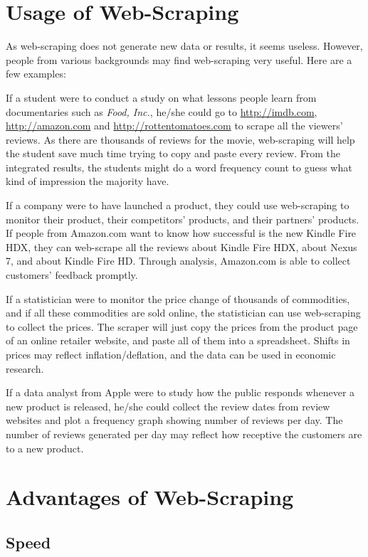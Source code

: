 \documentclass[12pt]{report}
\begin{document}
\section{Usage of Web-Scraping}
As web-scraping does not generate new data or results, it seems useless. However, people from various backgrounds may find web-scraping very useful. Here are a few examples:

If a student were to conduct a study on what lessons people learn from documentaries such as \textit{Food, Inc.}, he/she could go to \url{http://imdb.com}, \url{http://amazon.com} and \url{http://rottentomatoes.com} to scrape all the viewers' reviews. As there are thousands of reviews for the movie, web-scraping will help the student save much time trying to copy and paste every review. From the integrated results, the students might do a word frequency count to guess what kind of impression the majority have.

If a company were to have launched a product, they could use web-scraping to monitor their product, their competitors' products, and their partners' products. If people from Amazon.com  want to know how successful is the new Kindle Fire HDX, they can web-scrape all the reviews about Kindle Fire HDX, about Nexus 7, and about Kindle Fire HD. Through analysis, Amazon.com is able to collect customers' feedback promptly.

If a statistician were to monitor the price change of thousands of commodities, and if all these commodities are sold online, the statistician can use web-scraping to collect the prices. The scraper will just copy the prices from the product page of an online retailer website, and paste all of them into a spreadsheet. Shifts  in prices may reflect inflation/deflation, and the data can be used in economic research.

If a data analyst from Apple were to study how the public responds whenever a new product is released, he/she could collect the review dates from review websites and plot a frequency graph showing number of reviews per day. The number of reviews generated per day may reflect how receptive the customers are to a new product.

\section{Advantages of Web-Scraping}

\subsection{Speed}
\end{document}
